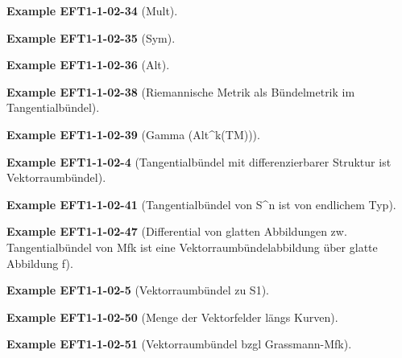 \documentclass[10pt, letterpaper]{article}
\newcommand{\CustomHeading}[3]{%
  \par\medskip\noindent%
  \textbf{#1 #2} \textnormal{(#3)}.\enskip%
}
\newenvironment{EXA}[2]{\CustomHeading{Example}{#1}{#2}}{}
\begin{document}
\begin{EXA}{EFT1-1-02-34}{Mult}

\end{EXA}

\begin{EXA}{EFT1-1-02-35}{Sym}

\end{EXA}

\begin{EXA}{EFT1-1-02-36}{Alt}

\end{EXA}

\begin{EXA}{EFT1-1-02-38}{Riemannische Metrik als Bündelmetrik im Tangentialbündel}

\end{EXA}

\begin{EXA}{EFT1-1-02-39}{Gamma (Alt^k(TM))}

\end{EXA}

\begin{EXA}{EFT1-1-02-4}{Tangentialbündel mit differenzierbarer Struktur ist Vektorraumbündel}

\end{EXA}

\begin{EXA}{EFT1-1-02-41}{Tangentialbündel von S^n ist von endlichem Typ}

\end{EXA}

\begin{EXA}{EFT1-1-02-47}{Differential von glatten Abbildungen zw. Tangentialbündel von Mfk ist eine Vektorraumbündelabbildung über glatte Abbildung f}

\end{EXA}

\begin{EXA}{EFT1-1-02-5}{Vektorraumbündel zu S1}

\end{EXA}

\begin{EXA}{EFT1-1-02-50}{Menge der Vektorfelder längs Kurven}

\end{EXA}

\begin{EXA}{EFT1-1-02-51}{Vektorraumbündel bzgl Grassmann-Mfk}

\end{EXA}
\end{document}
